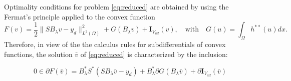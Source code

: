 \documentclass[11pt,a4paper]{amsart}
\newcommand{\om}{\Omega}
\newcommand{\norm}[1]{\lVert #1 \rVert}
\begin{document}
Optimality conditions for problem \eqref{eq:reduced} are obtained by using the Fermat's principle applied to the convex function 
$$F(v)= \frac{1}{2}\norm{SB_{\lambda}v-y_d}_{L^2(\om)}^2+ G(B_\lambda v) + \mathbf{I}_{V_{ad}}(v), \quad \text{with} \quad G(u) = \int_\om h^{**}(u) dx.$$
Therefore, in view of the the calculus rules for subdifferentials of convex functions,  the solution  $\bar v$ of \eqref{eq:reduced} is characterized by the inclusion: 

\begin{equation}\label{eq:oc_v}
0 \in \partial F (\bar v)= B_\lambda^*S^*(SB_\lambda \bar v -y_d) + B_\lambda^* \partial G(B_\lambda \bar v) + \partial \mathbf{I}_{V_{ad}}(\bar v) \end{equation}
\end{document}
